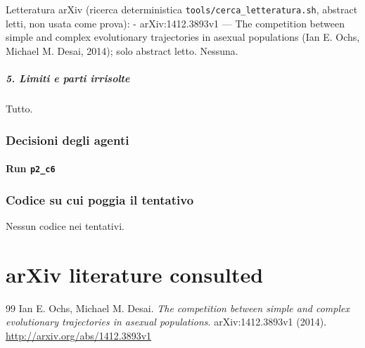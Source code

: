 \documentclass[11pt,a4paper]{article}
\begin{document}
Letteratura arXiv (ricerca deterministica
\texttt{tools/cerca\_letteratura.sh}, abstract letti, non usata come
prova): - arXiv:1412.3893v1 --- The competition between simple and
complex evolutionary trajectories in asexual populations (Ian E. Ochs,
Michael M. Desai, 2014); solo abstract letto. Nessuna.

\subparagraph{5. Limiti e parti
irrisolte}\label{limiti-e-parti-irrisolte}

Tutto.

\subsubsection{Decisioni degli agenti}
\paragraph{Run \texttt{p2\_c6}}

\subsubsection{Codice su cui poggia il tentativo}
Nessun codice nei tentativi.

\section{arXiv literature consulted}
\begin{thebibliography}{99}
 Ian E. Ochs, Michael M. Desai. \emph{The competition between simple and complex evolutionary trajectories in asexual populations}. arXiv:1412.3893v1 (2014). \url{http://arxiv.org/abs/1412.3893v1}
\end{thebibliography}
\end{document}
